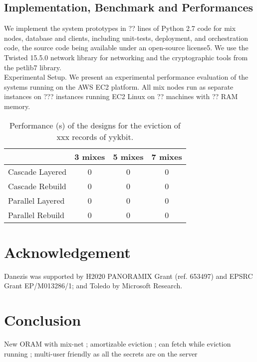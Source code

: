 \documentclass{llncs}
\begin{document}
\subsection{Implementation, Benchmark and Performances}\label{Implementation}

We implement the system prototypes in ?? lines of Python 2.7 code for mix nodes, database and clients, including unit-tests, deployment, and orchestration code, the source code being available under an open-source license5. We use the Twisted 15.5.0 network library for networking and the cryptographic tools from the petlib7 library.\\

Experimental Setup. We present an experimental performance evaluation of the systems running on the AWS EC2 platform. All mix nodes run as separate instances on ??? instances running EC2 Linux on ?? machines with ?? RAM memory. 
 
\begin{table}[H]
\centering
\begin{tabular}{l *3c}
\toprule
    					& 3 mixes	  	& 5 mixes		& 7 mixes	\\
\midrule
Cascade Layered  	& 0 				& 0 				& 0 			\\
Cascade Rebuild  	& 0 				& 0 				& 0 			\\
Parallel Layered 	& 0 				& 0 				& 0 			\\
Parallel Rebuild  	& 0 				& 0 				& 0 			\\
\bottomrule
\end{tabular}
\centering
\caption{Performance (s) of the designs for the eviction of xxx records of yykbit.}
\end{table}


\section{Acknowledgement}
Danezis was supported by H2020  PANORAMIX Grant (ref. 653497) and EPSRC Grant EP/M013286/1; and Toledo by Microsoft Research.


\section{Conclusion}\label{Conclusion}
New ORAM with mix-net ; amortizable eviction ; can fetch while eviction running ; multi-user friendly as all the secrets are on the server



\pagebreak


\end{document}
